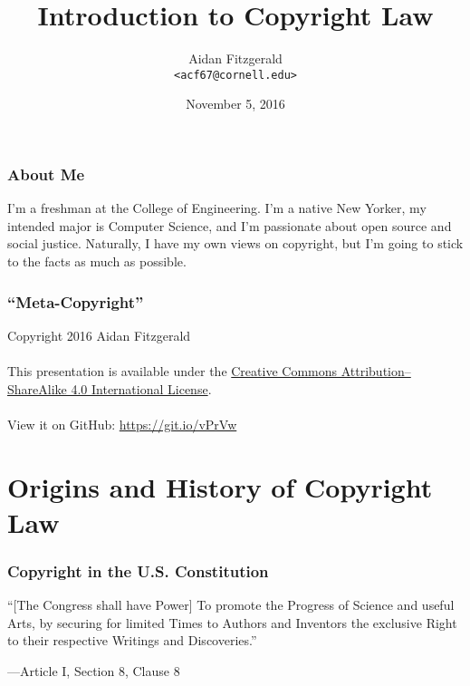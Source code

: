 \documentclass{beamer}
\title[Intro to Copyright]{Introduction to Copyright Law}
\author{
Aidan Fitzgerald \\
\texttt{<acf67@cornell.edu>}
}
\date{November 5, 2016}
\begin{document}
\begin{frame}
  \titlepage
\end{frame}

\begin{frame}
  \frametitle{About Me}

  I'm a freshman at the College of Engineering. I'm a native New Yorker,
  my intended major is Computer Science, and I'm passionate about open source
  and social justice. Naturally, I have my own views on copyright, but I'm going
  to stick to the facts as much as possible.

\end{frame}

\begin{frame}
  \frametitle{``Meta-Copyright''}

  Copyright \textcopyright{} 2016 Aidan Fitzgerald
  \\~\\
  This presentation is available under the \href{https://creativecommons.org/licenses/by-sa/4.0/}{Creative
  Commons Attribution--ShareAlike 4.0 International License}.
  \\~\\
  View it on GitHub: \url{https://git.io/vPrVw}

\end{frame}

\section[Origins and History]{Origins and History of Copyright Law}

\begin{frame}
  \frametitle{Copyright in the U.S. Constitution}

  ``[The Congress shall have Power] To promote the Progress of Science and useful
  Arts, by securing for limited Times to Authors and Inventors the exclusive
  Right to their respective Writings and Discoveries.''

  \begin{flushright}
    ---Article I, Section 8, Clause 8
  \end{flushright}
\end{frame}
\end{document}
